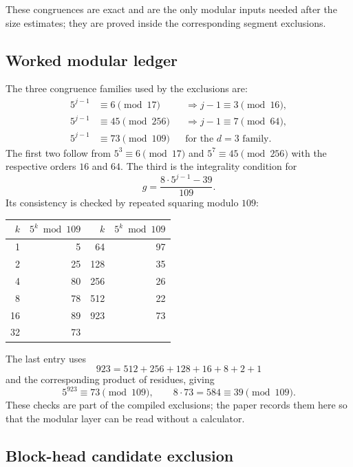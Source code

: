 These congruences are exact and are the only modular inputs needed
after the size estimates; they are proved inside the corresponding
segment exclusions.

\subsection{Worked modular ledger}

The three congruence families used by the exclusions are:
\begin{align*}
  5^{j-1}&\equiv6\pmod{17}
  &&\Longrightarrow j-1\equiv3\pmod{16},\\
  5^{j-1}&\equiv45\pmod{256}
  &&\Longrightarrow j-1\equiv7\pmod{64},\\
  5^{j-1}&\equiv73\pmod{109}
  &&\text{for the }d=3\text{ family}.
\end{align*}
The first two follow from $5^3\equiv6\pmod{17}$ and
$5^7\equiv45\pmod{256}$ with the respective orders $16$ and $64$.
The third is the integrality condition for
\begin{equation*}
  g=\frac{8\cdot5^{j-1}-39}{109}.
\end{equation*}
Its consistency is checked by repeated squaring modulo $109$:
\begin{center}
\small
\begin{tabular}{@{}rrrr@{}}
\toprule
$k$ & $5^k\bmod 109$ & $k$ & $5^k\bmod 109$ \\
\midrule
1 & 5 & 64 & 97 \\
2 & 25 & 128 & 35 \\
4 & 80 & 256 & 26 \\
8 & 78 & 512 & 22 \\
16 & 89 & 923 & 73 \\
32 & 73 & & \\
\bottomrule
\end{tabular}
\end{center}
The last entry uses
\begin{equation*}
  923=512+256+128+16+8+2+1
\end{equation*}
and the corresponding product of residues, giving
\begin{equation*}
  5^{923}\equiv73\pmod{109},
\qquad
  8\cdot73=584\equiv39\pmod{109}.
\end{equation*}
These checks are part of the compiled exclusions; the paper records
them here so that the modular layer can be read without a calculator.

\subsection{Block-head candidate exclusion}


